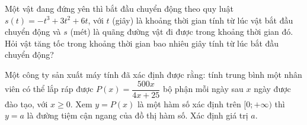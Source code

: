 \begin{bt}%
	Một vật đang đứng yên thì bắt đầu chuyển động theo quy luật $s(t)=-t^3+3t^2+6t$, với $t$ (giây) là khoảng thời gian tính từ lúc vật bắt đầu chuyển động và $s$ (mét) là quãng đường vật đi được trong khoảng thời gian đó. Hỏi vật tăng tốc trong khoảng thời gian bao nhiêu giây tính từ lúc bắt đầu chuyển động?
\end{bt}

\begin{bt}%
	Một công ty sản xuất máy tính đã xác định được rằng: tính trung bình một nhân viên có thể lắp ráp được $P(x)=\dfrac{500x}{4x+25}$ bộ phận mỗi ngày sau $x$ ngày được đào tạo, với $x \geq 0$. Xem $y=P(x)$ là một hàm số xác định trên $[0;+\infty)$ thì $y=a$ là đường tiệm cận ngang của đồ thị hàm số. Xác định giá trị $a$.
\end{bt}

